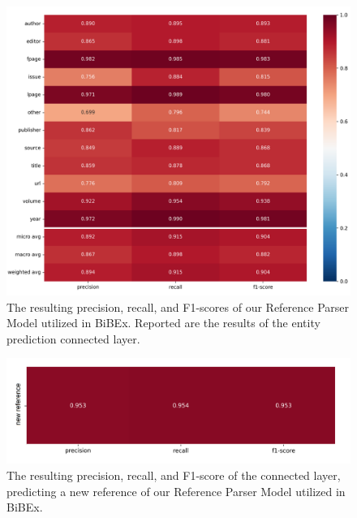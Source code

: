\begin{figure}[bp!]
    \centering
    \includegraphics[width=1.0\linewidth]{images/results/reference_parser/ref_seg_cls_croped.png}
    \caption{The resulting precision, recall, and F1-scores of our Reference Parser Model utilized in BiBEx. Reported are the results of the entity prediction connected layer.}
    \label{fig:results_final_refseg_cls}
\end{figure}

\begin{figure}[bp!]
    \centering
    \includegraphics[width=0.8\linewidth]{images/results/reference_parser/ref_seg_croped.png}
    \caption{The resulting precision, recall, and F1-score of the connected layer, predicting a new reference of our Reference Parser Model utilized in BiBEx.}
    \label{fig:results_final_refseg_ref}
\end{figure}

\FloatBarrier

